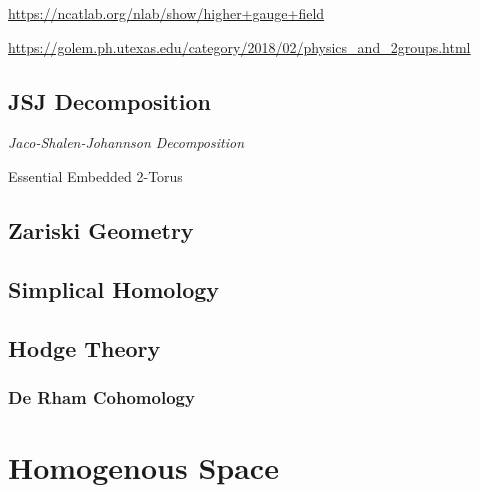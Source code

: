 \url{https://ncatlab.org/nlab/show/higher+gauge+field}

\url{https://golem.ph.utexas.edu/category/2018/02/physics_and_2groups.html}



\subsection{JSJ Decomposition}\label{sec:jsj_decomposition}

\emph{Jaco-Shalen-Johannson Decomposition}

Essential Embedded 2-Torus



\subsection{Zariski Geometry}\label{sec:zariski_geometry}

\subsection{Simplical Homology}\label{sec:simplical_homology}

\subsection{Hodge Theory}\label{sec:hodge_theory}

\subsubsection{De Rham Cohomology}\label{sec:derham_cohomology}



\section{Homogenous Space}\label{sec:homogenous_space}

